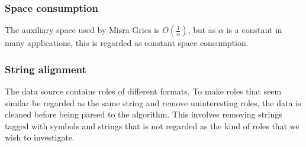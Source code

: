 \subsubsection{Space consumption}
The auxiliary space used by Misra Gries is \(O\left(\frac{1}{\alpha}\right)\), but as \(\alpha\) is a constant in many applications, this is regarded as constant space consumption.

\subsubsection{String alignment}
The data source contains roles of different formats. To make roles that seem similar be regarded as the same string and remove uninteresting roles, the data is cleaned before being parsed to the algorithm. This involves removing strings tagged with symbols and strings that is not regarded as the kind of roles that we wish to investigate.
